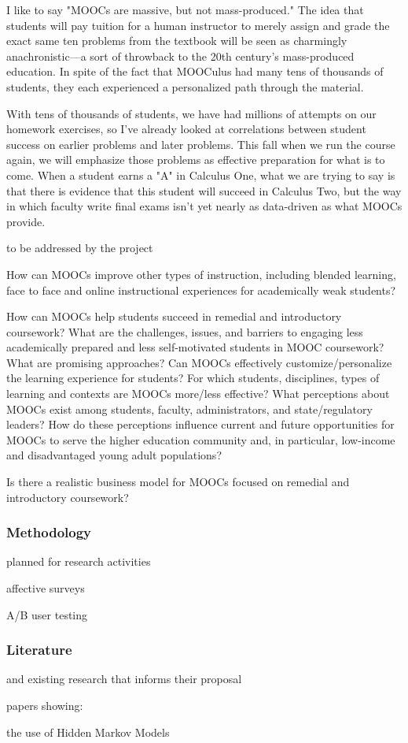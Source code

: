 \documentclass[12pt]{article}
\begin{document}
I like to say "MOOCs are massive, but not mass-produced."  The idea
that students will pay tuition for a human instructor to merely assign
and grade the exact same ten problems from the textbook will be seen
as charmingly anachronistic---a sort of throwback to the 20th
century's mass-produced education.  In spite of the fact that MOOCulus
had many tens of thousands of students, they each experienced a
personalized path through the material.

With tens of thousands of students, we have had millions of attempts
on our homework exercises, so I've already looked at correlations
between student success on earlier problems and later problems.  This
fall when we run the course again, we will emphasize those problems as
effective preparation for what is to come.  When a student earns a "A"
in Calculus One, what we are trying to say is that there is evidence
that this student will succeed in Calculus Two, but the way in which
faculty write final exams isn't yet nearly as data-driven as what
MOOCs provide.

to be addressed by the project

How can MOOCs improve other types of instruction, including blended
learning, face to face and online instructional experiences for
academically weak students?

How can MOOCs help students succeed in remedial and introductory
coursework?  What are the challenges, issues, and barriers to engaging
less academically prepared and less self-motivated students in MOOC
coursework? What are promising approaches?  Can MOOCs effectively
customize/personalize the learning experience for students?  For which
students, disciplines, types of learning and contexts are MOOCs
more/less effective?  What perceptions about MOOCs exist among
students, faculty, administrators, and state/regulatory leaders? How
do these perceptions influence current and future opportunities for
MOOCs to serve the higher education community and, in particular,
low-income and disadvantaged young adult populations?

Is there a realistic business model for MOOCs focused on remedial and introductory coursework?

\subsubsection*{Methodology}

planned for research activities

affective surveys

A/B user testing

\subsubsection*{Literature}



and existing research
that informs their proposal
 
papers showing: 

the use of Hidden Markov Models
\end{document}
